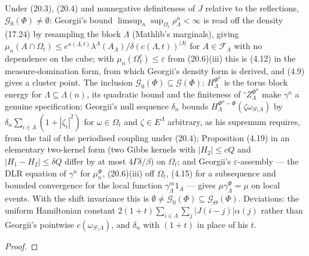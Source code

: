 \begin{theorem}
    Under (20.3), (20.4) and nonnegative definiteness of $J$ relative to the reflections,
    $\mathcal G_0(\Phi) \neq \emptyset$: Georgii's bound $\limsup_n\sup_{\Omega_t}\rho^n_\Lambda < \infty$
    is read off the density (17.24) by resampling the block $\Lambda$ (Mathlib's marginals), giving
    $\mu_n(A \cap \Omega_t) \leq e^{\kappa(\Lambda,t)}\lambda^\Lambda(A_\Lambda)/\delta(c(\Lambda,t))^{|\Lambda|}$
    for $A \in \mathcal F_\Lambda$ with no dependence on the cube; with $\mu_n(\Omega_t^c) \leq
    \varepsilon$ from (20.6)(iii) this is (4.12) in the measure-domination form, from which
    Georgii's density form is derived, and (4.9) gives a cluster point. The inclusion
    $\mathcal G_0(\Phi) \subseteq \mathcal G(\Phi)$: $H^{\Phi^n}_\Lambda$ is the torus block energy for
    $\Lambda \subseteq \Lambda(n)$, its quadratic bound and the finiteness of ${}^\circ Z^{\Phi^n}_\Lambda$
    make $\gamma^n$ a genuine specification; Georgii's null sequence $\delta_n$ bounds
    $H^{\Phi^n-\Phi}_\Lambda(\zeta\omega_{S\setminus\Lambda})$ by $\delta_n\sum_{i\in\Lambda}(1+|\zeta_i|^2)$ for
    $\omega \in \Omega_t$ and $\zeta \in E^\Lambda$ arbitrary, as his supremum requires, from the tail
    of the periodised coupling under (20.4); Proposition (4.19) in an elementary two-kernel form
    (two Gibbs kernels with $|H_2| \leq cQ$ and $|H_1 - H_2| \leq \delta Q$ differ by at most
    $4\Gamma\delta/\beta$) on $\Omega_t$; and Georgii's $\varepsilon$-assembly --- the DLR equation of
    $\gamma^n$ for $\mu^\Phi_n$, (20.6)(iii) off $\Omega_t$, (4.15) for a subsequence and bounded
    convergence for the local function $\gamma^m_\Lambda 1_A$ --- gives $\mu\gamma^\Phi_\Lambda = \mu$ on
    local events. With the shift invariance this is $\emptyset \neq \mathcal G_0(\Phi) \subseteq
    \mathcal G_\Theta(\Phi)$. Deviations: the uniform Hamiltonian constant
    $2(1+t)\sum_{i\in\Lambda}\sum_j|J(i-j)|\alpha(j)$ rather than Georgii's pointwise
    $c(\omega_{S\setminus\Lambda})$, and $\delta_n$ with $(1+t)$ in place of his $t$.
\end{theorem}
\begin{proof}
    \leanok
\end{proof}

